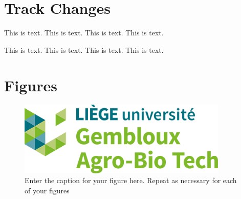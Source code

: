 \documentclass[utf8]{ReportTERRA}
\begin{document}
\section{Track Changes}

This is  text.
This is  text.
This is text.
This is  text.

This is  text.
This is  text.
This is text.
This is  text.

\listofchanges

 



\section*{Figures}

\begin{figure}[h!]
\begin{center}
\includegraphics[width=10cm]{GABTlogo.png}
\end{center}
\caption{Enter the caption for your figure here.  Repeat as  necessary for each of your figures}\label{fig:1}
\end{figure}
\end{document}
